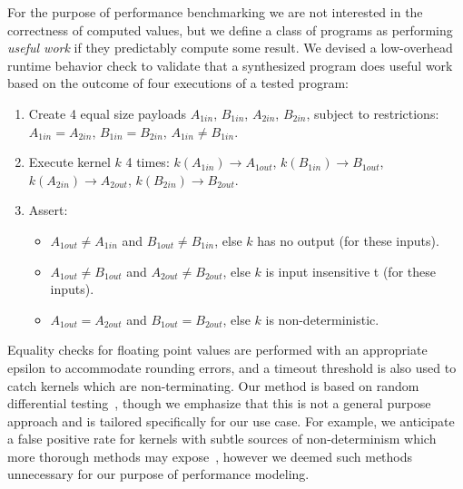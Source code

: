 For the purpose of performance benchmarking we are not interested in the correctness of computed values, but we define a class of programs as performing \emph{useful work} if they predictably compute some result. We devised a low-overhead runtime behavior check to validate that a synthesized program does useful work based on the outcome of four executions of a tested program:%
%
\begin{enumerate}
\item Create 4 equal size payloads $A_{1in}$, $B_{1in}$, $A_{2in}$,
  $B_{2in}$, subject to restrictions: $A_{1in}=A_{2in}$,
  $B_{1in}=B_{2in}$, $A_{1in} \ne B_{1in}$.
\item Execute kernel $k$ 4 times: $k(A_{1in}) \rightarrow A_{1out}$,
  $k(B_{1in}) \rightarrow B_{1out}$,
  $k(A_{2in}) \rightarrow A_{2out}$,
  $k(B_{2in}) \rightarrow B_{2out}$.
\item Assert:
  \begin{itemize}
  \item $A_{1out} \ne A_{1in}$ and $B_{1out} \ne B_{1in}$, else $k$ has no
  output (for these inputs).%
  \item $A_{1out} \ne B_{1out}$ and $A_{2out} \ne B_{2out}$, else $k$ is input insensitive t (for these inputs).%
  \item $A_{1out}=A_{2out}$ and $B_{1out}=B_{2out}$, else $k$ is
  non-deterministic.
  \end{itemize}
\end{enumerate}
%
\noindent%
Equality checks for floating point values are performed with an appropriate epsilon to accommodate rounding errors, and a timeout threshold is also used to catch kernels which are non-terminating. Our method is based on random differential testing~\cite{McKeeman1998}, though we emphasize that this is not a general purpose approach and is tailored specifically for our use case. For example, we anticipate a false positive rate for kernels with subtle sources of non-determinism which more thorough methods may expose~\cite{Betts2012,Price2015,Sorensen2016}, however we deemed such methods unnecessary for our purpose of performance modeling.